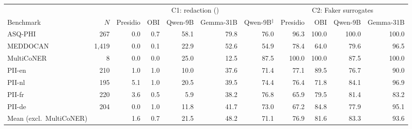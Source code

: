 \begin{tabular}{lrrrrrrrrrr}
\toprule
 & & \multicolumn{5}{c}{C1: redaction (\tp{*****})} & \multicolumn{4}{c}{C2: Faker surrogates}\\
\cmidrule(lr){3-7}\cmidrule(lr){8-11}
Benchmark & $N$ & Presidio & OBI & Qwen-9B & Gemma-31B & Qwen-9B$^{\ddagger}$ & Presidio & OBI & Qwen-9B & Gemma-31B\\
\midrule
ASQ-PHI & 267 & 0.0 & 0.7 & 58.1 & 79.8 & 76.0 & 96.3 & 100.0 & 100.0 & 100.0\\
MEDDOCAN & 1{,}419 & 0.0 & 0.1 & 22.9 & 52.6 & 54.9 & 78.4 & 64.0 & 79.6 & 96.5\\
MultiCoNER & 8 & 0.0 & 0.0 & 25.0 & 12.5 & 87.5 & 100.0 & 100.0 & 87.5 & 100.0\\
PII-en & 210 & 1.0 & 1.0 & 10.0 & 37.6 & 71.4 & 77.1 & 89.5 & 76.7 & 90.0\\
PII-nl & 195 & 5.1 & 1.0 & 20.5 & 39.5 & 74.4 & 76.4 & 71.8 & 84.1 & 96.9\\
PII-fr & 220 & 3.6 & 0.5 & 5.9 & 38.2 & 76.8 & 65.9 & 79.5 & 81.4 & 83.2\\
PII-de & 204 & 0.0 & 1.0 & 11.8 & 41.7 & 73.0 & 67.2 & 84.8 & 77.9 & 95.1\\
\midrule
Mean (excl.\ MultiCoNER) & & 1.6 & 0.7 & 21.5 & 48.2 & 71.1 & 76.9 & 81.6 & 83.3 & 93.6\\
\bottomrule
\end{tabular}

